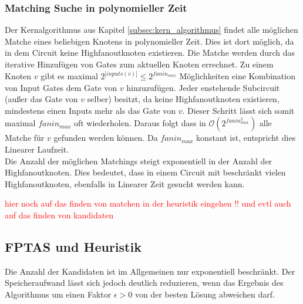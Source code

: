 \documentclass[11pt, a4paper, german]{article}
\begin{document}
\subsubsection{Matching Suche in polynomieller Zeit}
Der Kernalgorithmus aus Kapitel \ref{subsec:kern_algorithmus} findet alle möglichen Matche eines beliebigen Knotens in polynomieller Zeit. Dies ist dort möglich, da in dem Circuit keine Highfanoutknoten existieren. Die Matche werden durch das iterative  Hinzufügen von Gates zum aktuellen Knoten errechnet. Zu einem Knoten $v$ gibt es maximal  $2^{|inputs(v)|} \leq 2^{fanin_{max}}$ Möglichkeiten eine Kombination von Input Gates dem Gate von $v$ hinzuzufügen. Jeder enstehende Subcircuit (außer das Gate von $v$ selber) besitzt, da keine Highfanoutknoten existieren, mindestens einen Inputs mehr als das Gate von $v$. Dieser Schritt lässt sich somit maximal $fanin_{max}$ oft wiederholen. Daraus folgt dass in $\mathcal{O}(2^{fanin_{max}^2})$ alle Matche für $v$ gefunden werden können. Da $fanin_{max}$ konstant ist, entspricht dies Linearer Laufzeit. \\
Die Anzahl der möglichen Matchings steigt exponentiell in der Anzahl der Highfanoutknoten. Dies bedeutet, dass in einem Circuit mit beschränkt vielen Highfanoutknoten, ebenfalls in Linearer Zeit gesucht werden kann.

\textcolor{red}{hier noch auf das finden von matchen in der heuristik eingehen !! und evtl auch auf das finden von kandidaten}
 
\subsection{FPTAS und Heuristik}
\label{subsec:fptas}
Die Anzahl der Kandidaten ist im Allgemeinen nur exponentiell beschränkt. Der Speicheraufwand lässt sich jedoch deutlich reduzieren, wenn das Ergebnis des Algorithmus um einen Faktor $\epsilon > 0$ von der besten Lösung abweichen darf. \\
\end{document}
